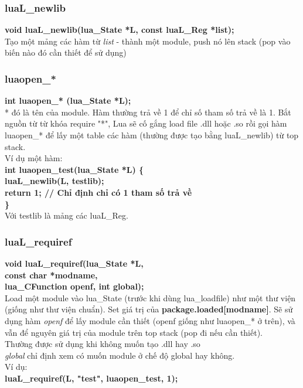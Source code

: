 \documentclass[12pt]{article}
\begin{document}
\subsubsection{luaL\_newlib} 
\textbf{void luaL\_newlib(lua\_State *L, const luaL\_Reg *list);} \\
Tạo một mảng các hàm từ \textit{list} - thành một module, push nó lên stack (pop vào biến nào đó cần thiết để sử dụng)
\subsubsection{luaopen\_*} 
\textbf{int luaopen\_* (lua\_State *L);}  \\
* đó là tên của module. Hàm thường trả về 1 để chỉ số tham số trả về là 1. Bắt nguồn từ từ khóa require "*", Lua sẽ cố gắng load file .dll hoặc .so rồi gọi hàm luaopen\_* để lấy một table các hàm (thường được tạo bằng luaL\_newlib) từ top stack. \\
Ví dụ một hàm: \\ 
{ \bfseries
int luaopen\_test(lua\_State *L) \{ \\
\hspace*{1cm}luaL\_newlib(L, testlib); \\
\hspace*{1cm}return 1; // Chỉ định chỉ có 1 tham số trả về \\
\}
} \\
Với testlib là mảng các luaL\_Reg.

\subsubsection{luaL\_requiref} 
\textbf{void luaL\_requiref(lua\_State *L, \\
\hspace*{4cm} const char *modname, \\
\hspace*{4cm} lua\_CFunction openf, int global);} \\
Load một module vào lua\_State (trước khi dùng lua\_loadfile) như một thư viện (giống như thư viện chuẩn). Set giá trị của \textbf{package.loaded[modname]}. Sẽ sử dụng hàm \textit{openf} để lấy module cần thiết (openf giống như luaopen\_* ở trên), và vẫn để nguyên giá trị của module trên top stack (pop đi nếu cần thiết).  \\
Thường được sử dụng khi không muốn tạo .dll hay .so \\
\textit{global} chỉ định xem có muốn module ở chế độ global hay không. \\
Ví dụ: \\
\textbf{
luaL\_requiref(L, "test", luaopen\_test, 1);
}
\end{document}
